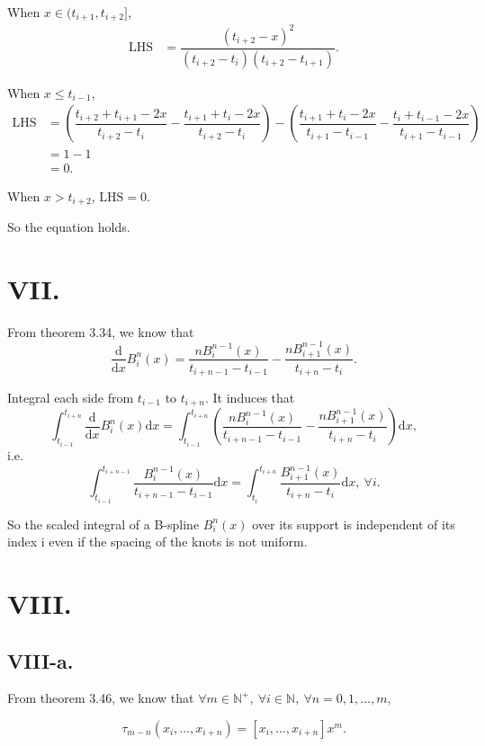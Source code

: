 \documentclass[a4paper]{article}
\begin{document}
When $x\in (t_{i+1},t_{i+2}]$, 
$$
\begin{aligned}
  \text{LHS}&=\dfrac{(t_{i+2}-x)^{2}}{(t_{i+2}-t_{i})(t_{i+2}-t_{i+1})}.
\end{aligned}
$$

When $x\leq t_{i-1}$, 
$$
\begin{aligned}
  \text{LHS}&=(\dfrac{t_{i+2}+t_{i+1}-2x}{t_{i+2}-t_{i}}-\dfrac{t_{i+1}+t_{i}-2x}{t_{i+2}-t_{i}})-(\dfrac{t_{i+1}+t_{i}-2x}{t_{i+1}-t_{i-1}}-\dfrac{t_{i}+t_{i-1}-2x}{t_{i+1}-t_{i-1}})\\
  &=1-1\\
  &=0.
\end{aligned}
$$

When $x>t_{i+2}$, $\text{LHS}=0$.

So the equation holds.

\section*{VII.}
From theorem 3.34, we know that 
$$
\frac{\mathrm{d}}{\mathrm{d}x}B_i^n(x)=\frac{nB_i^{n-1}(x)}{t_{i+n-1}-t_{i-1}}-\frac{nB_{i+1}^{n-1}(x)}{t_{i+n}-t_i}.
$$

Integral each side from $t_{i-1}$ to $t_{i+n}$. It induces that 
$$
\int_{t_{i-1}}^{t_{i+n}}\frac{\mathrm{d}}{\mathrm{d}x}B_i^n(x)\mathrm{d}x=\int_{t_{i-1}}^{t_{i+n}}(\frac{nB_{i}^{n-1}(x)}{t_{i+n-1}-t_{i-1}}-\frac{nB_{i+1}^{n-1}(x)}{t_{i+n}-t_{i}})\mathrm{d}x,
$$
i.e. 
$$
\int_{t_{i-1}}^{t_{i+n-1}}\frac{B_{i}^{n-1}(x)}{t_{i+n-1}-t_{i-1}}\mathrm{d}x=\int_{t_{i}}^{t_{i+n}}\frac{B_{i+1}^{n-1}(x)}{t_{i+n}-t_{i}}\mathrm{d}x, \ \forall i.
$$

So the scaled integral of a B-spline $B^n_{i} (x)$ over its support is independent of its index i even if the spacing of the knots is not uniform.

\section*{VIII.}
\subsection*{VIII-a.}
From theorem 3.46, we know that $\forall m\in\mathbb{N}^{+},\:\forall i\in\mathbb{N},\:\forall n=0,1,\ldots,m,$

\begin{equation}\label{eq:8.1}
  \tau_{m-n}(x_{i},\ldots,x_{i+n})=[x_{i},\ldots,x_{i+n}]x^{m}.
\end{equation}
\end{document}
